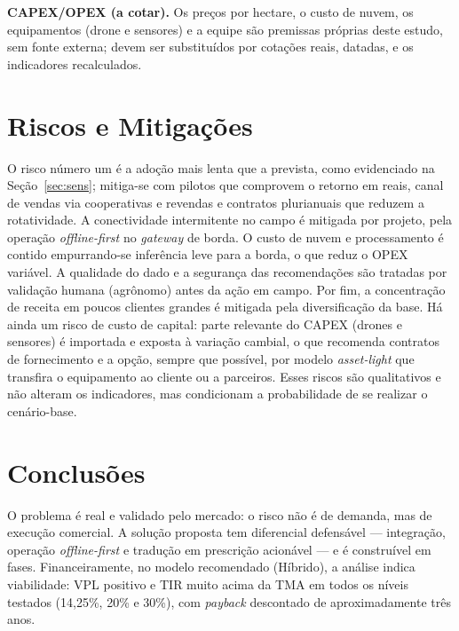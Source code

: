 \documentclass[conference]{IEEEtran}
\begin{document}
\textbf{CAPEX/OPEX (a cotar).} Os preços por hectare, o custo de nuvem, os equipamentos (drone e sensores) e a equipe são premissas próprias deste estudo, sem fonte externa; devem ser substituídos por cotações reais, datadas, e os indicadores recalculados.

\section{Riscos e Mitigações}
O risco número um é a adoção mais lenta que a prevista, como evidenciado na Seção~\ref{sec:sens}; mitiga-se com pilotos que comprovem o retorno em reais, canal de vendas via cooperativas e revendas e contratos plurianuais que reduzem a rotatividade. A conectividade intermitente no campo é mitigada por projeto, pela operação \textit{offline-first} no \textit{gateway} de borda. O custo de nuvem e processamento é contido empurrando-se inferência leve para a borda, o que reduz o OPEX variável. A qualidade do dado e a segurança das recomendações são tratadas por validação humana (agrônomo) antes da ação em campo. Por fim, a concentração de receita em poucos clientes grandes é mitigada pela diversificação da base. Há ainda um risco de custo de capital: parte relevante do CAPEX (drones e sensores) é importada e exposta à variação cambial, o que recomenda contratos de fornecimento e a opção, sempre que possível, por modelo \textit{asset-light} que transfira o equipamento ao cliente ou a parceiros. Esses riscos são qualitativos e não alteram os indicadores, mas condicionam a probabilidade de se realizar o cenário-base.

\section{Conclusões}
O problema é real e validado pelo mercado: o risco não é de demanda, mas de execução comercial. A solução proposta tem diferencial defensável --- integração, operação \textit{offline-first} e tradução em prescrição acionável --- e é construível em fases. Financeiramente, no modelo recomendado (Híbrido), a análise indica viabilidade: VPL positivo e TIR muito acima da TMA em todos os níveis testados (14,25\%, 20\% e 30\%), com \textit{payback} descontado de aproximadamente três anos.
\end{document}
